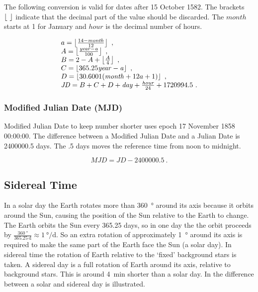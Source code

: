 The following conversion is valid for dates after 15 October 1582. The
brackets $\left \lfloor \  \right \rfloor$ indicate that the decimal part of the value should
be discarded. The $\mathit{month}$ starts at 1 for January and
$\mathit{hour}$ is the decimal number of hours.

\begin{equation}
    \begin{array}{l}
        a = \left \lfloor \frac{14 - \mathit{month}}{12} \right \rfloor \ , \\
        A = \left \lfloor \frac{\mathit{year - a}}{100} \right \rfloor \ , \\
        B = 2 - A + \left \lfloor \frac{A}{4} \right \rfloor \ , \\
        C = \left \lfloor 365.25 \mathit{year - a} \right \rfloor \ , \\
        D = \left \lfloor 30.6001 (\mathit{month} + 12 a + 1) \right \rfloor \ , \\
        \mathit{JD} = B + C + D + \mathit{day} +
                      \frac{\mathit{hour}}{24} + 1720994.5 \ .
    \end{array}
\end{equation}


\subsubsection{Modified Julian Date (MJD)}

Modified Julian Date to keep number shorter uses epoch 17 November 1858
00:00:00. The difference between a Modified Julian Date and a Julian
Date is 2400000.5 days. The .5 days moves the reference time from noon
to midnight.

\begin{equation}
    \mathit{MJD} = \mathit{JD} - 2400000.5 \ .
\end{equation}


\subsection{Sidereal Time}

In a solar day the Earth rotates more than \SI{360}{\degree} around its
axis because it orbits around the Sun, causing the position of the Sun
relative to the Earth to change. The Earth orbits the Sun every 365.25
days, so in one day the the orbit proceeds by
$\frac{\SI{360}{\degree}}{\SI{365.25}{\day}} \approx
\SI{1}{\degree\per\day}$. So an extra rotation of approximately
\SI{1}{\degree} around its axis is required to make the same part of the
Earth face the Sun (a solar day). In sidereal time the rotation of Earth
relative to the `fixed' background stars is taken. A sidereal day is a
full rotation of Earth around its axis, relative to background stars.
This is around \SI{4}{\minute} shorter than a solar day. In
 the difference between a solar and sidereal
day is illustrated.

